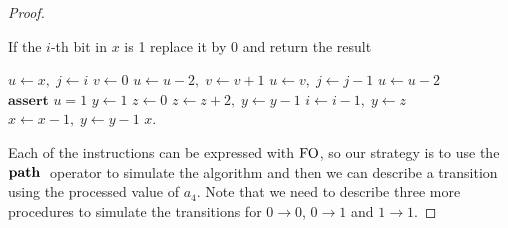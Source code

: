 \begin{proof}
	\begin{algorithm}
	\caption{If the $i$-th bit in $x$ is 1 replace it by 0 and return the result}
	\label{switch1to0}
	\begin{algorithmic}
		\State $u \gets x,\; j \gets i$ 
		\State $v \gets 0$
		\State $u \gets u-2,\; v \gets v+1$
		\EndWhile
		\State $u\gets v,\; j \gets j-1$
		\EndWhile
		\State $u \gets u-2$
		\EndWhile
		\State $\textbf{assert } u = 1$ 	
		\State $y \gets 1$ 
		\State $z \gets 0$
		\State $z \gets z+2,\; y \gets y-1$
		\EndWhile
		\State $i \gets i-1,\; y \gets z$
		\EndWhile
		 
		\State $x \gets x-1,\; y \gets y-1$
		\EndWhile
		\State \Return $x$.
	\end{algorithmic}
	\end{algorithm}	
	Each of the instructions can be expressed with ${\rm FO}$, so our strategy is to use the ${\bf path} \;$ operator to simulate the algorithm and then we can describe a transition using the processed value of $a_4$. Note that we need to describe three more procedures to simulate the transitions for $0\to 0$, $0 \to 1$ and $1\to 1$.
	

\end{proof}
